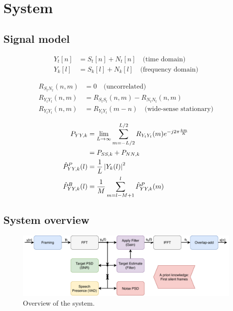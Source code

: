 \section{System} \label{sec:system}
\subsection{Signal model}

\begin{align}
  Y_{t}[n] &= S_{t}[n] + N_{t}[n] \quad \text{(time domain)}
  \label{eq:signal_time} \\
  Y_{k}[l] &= S_{k}[l] + N_{k}[l] \quad \text{(frequency domain)}
  \label{eq:signal_freq}
\end{align}

\begin{align}
  R_{S_{t}N_{t}}(n,m) &= 0 \quad \text{(uncorrelated)}
  \label{eq:signal_uncorrelated1} \\
  R_{Y_{t}Y_{t}}(n,m) &= R_{S_{t}S_{t}}(n,m) - R_{N_{t}N_{t}}(n,m)
  \label{eq:signal_uncorrelated2} \\
  R_{Y_{t}Y_{t}}(n,m) &= R_{Y_{t}Y_{t}}(m-n) \quad \text{(wide-sense stationary)}
  \label{eq:signal_wss}
\end{align}

\begin{align}
  P_{YY,k} &= \lim_{L \to \infty} \sum_{m=-L/2}^{L/2} R_{Y_{t}Y_{t}}(m) e^{-j2\pi \frac{km}{K}}
  \label{eq:pyyk1} \\
  &= P_{SS,k} + P_{NN,k}
  \label{eq:pyyk2} \\
  \hat P_{YY,k}^{P}(l) &= \frac{1}{L}\abs{Y_{k}(l)}^{2}
  \label{eq:pyyest} \\
  \hat P_{YY,k}^{B}(l) &= \frac{1}{M}\sum_{m=l-M+1}^{l} \hat P_{YY,k}^{P}(m)
  \label{eq:pyyBest}
\end{align}

\subsection{System overview}
\begin{figure}
  \includegraphics[width=\textwidth]{images/system.pdf}
  \caption{Overview of the system.}
  \label{fig:system}
\end{figure}
